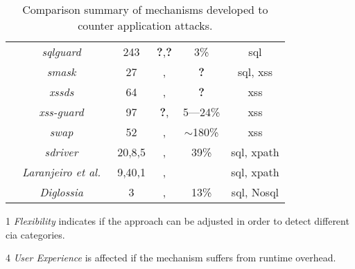\documentclass[conference]{IEEEtran}
\newcommand{\tick}{\ding{52}}
\newcommand{\xmark}{\ding{56}}
\begin{document}
\begin{table*}
\begin{threeparttable}
\begin{small}
{\begin{tabular}{l|c|c|cc|c}
	& 	{\it {\sc sqlg}uard}~\cite{BWS05} & 243 & {\bf ?},{\bf ?} & 3\% & {\sc sql} \\
	& 	{\it {\sc sm}ask}~\cite{JB07} & 27 & \xmark,\xmark & {\bf ?} & {\sc sql}, {\sc xss} \\
	& 	{\it {\sc xssds}}~\cite{JEP08} & 64 & \xmark,\xmark & {\bf ?} &  {\sc xss} \\
    & 	{\it {\sc xss-guard}}~\cite{BV08} & 97 & {\bf ?},\xmark & 5---24\% & {\sc xss} \\
    & 	{\it {\sc swap}}~\cite{WPLKK09} & 52 & \tick,\tick & $\sim$180\% & {\sc xss} \\ 
	& 	{\it {\sc sd}river}~\cite{MS09,MKS09,MKLS11} & 20,8,5 & \tick,\tick & 39\% & {\sc sql}, {\sc xp}ath \\
	& 	{\it Laranjeiro et al.}~\cite{LVM09,ALVM09,LVM10} & 9,40,1 & \xmark,\xmark  & \xmark & {\sc sql}, {\sc xp}ath \\
	& 	{\it Diglossia}~\cite{SMS13} & 3 & \xmark,\xmark  & 13\% & {\sc sql}, No{\sc sql} \\
	\hline
    \end{tabular}}
    \begin{tablenotes}
	\begin{footnotesize}
       \item[1] {\it Flexibility} indicates if the approach can be adjusted
	in order to detect different {\sc cia} categories.
       \item[4] {\it User Experience} is affected if the mechanism suffers
	from runtime overhead.
	\end{footnotesize}
    \end{tablenotes}
    \caption{Comparison summary of mechanisms developed to counter application attacks.}
    \label{tab:comp2}
    \end{small}
    \end{threeparttable}
\end{table*}



\end{document}
